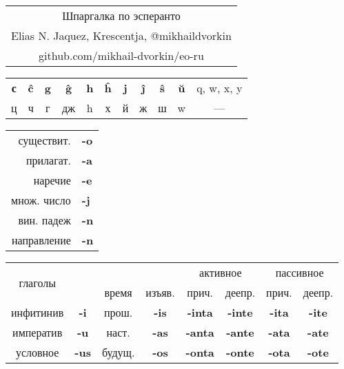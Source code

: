\documentclass{article}
\def\b#1{\textbf{#1}}
\begin{document}
\hspace{2em}
\begin{tabular}{c}
{\Huge Шпаргалка по эсперанто} \\
{\small Elias N. Jaquez, Krescentja, @mikhail\textunderscore{}dvorkin} \\
{\small github.com/mikhail-dvorkin/eo-ru} \\
\end{tabular}
\hspace{2em}
\begin{tabular}{|c|c|c|c|c|c|c|c|c|c|c|}
\hline
\b{с} & \b{ĉ} & \b{g} & \b{ĝ} & \b{h} & \b{ĥ} & \b{j} & \b{ĵ} & \b{ŝ} & \b{ŭ} & q, w, x, y \\
ц & ч & г & дж & h & х & й & ж & ш & w & --- \\
\hline
\end{tabular}

\begin{tabular}{|r>{\bfseries}l|}
\hline
существит. & -o \\
прилагат. & -a \\
наречие & -e \\
множ. число & -j \\
вин. падеж & -n \\
направление & -n \\
\hline
\end{tabular}
\quad
\begin{tabular}{|cc|c|c|c|c|c|c|}
\hline
\multirow{2}{*}{глаголы} & & & & \multicolumn{2}{c|}{активное} & \multicolumn{2}{c|}{пассивное} \\
\cline{5-8}
& & время & изъяв. & прич. & деепр. & прич. & деепр. \\
\hline
инфитинив & \b{-i} & прош. & \b{-is} & \b{-inta} & \b{-inte} & \b{-ita} & \b{-ite} \\
\cline{3-8}
императив & \b{-u} & наст. & \b{-as} & \b{-anta} & \b{-ante} & \b{-ata} & \b{-ate} \\
\cline{3-8}
условное & \b{-us} & будущ. & \b{-os} & \b{-onta} & \b{-onte} & \b{-ota} & \b{-ote} \\
\hline
\end{tabular}
\end{document}
